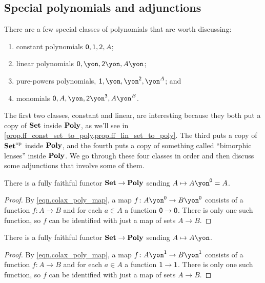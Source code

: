 \documentclass[DynamicalBook]{subfiles}
\begin{document}
\subsection{Special polynomials and adjunctions}

There are a few special classes of polynomials that are worth discussing: 
\begin{enumerate}
	\item constant polynomials $\textsf{0},\textsf{1},\textsf{2},A$; 
	\item linear polynomials $\0,\yon, \2\yon, A\yon$;
	\item pure-powers polynomials, $\1, \yon, \yon^\2, \yon^A$; and 
	\item monomials $\0, A, \yon, \2\yon^\3, A\yon^B$.
\end{enumerate}
The first two classes, constant and linear, are interesting because they both put a copy of $\textbf{Set}$ inside $\textbf{Poly}$, as we'll see in \cref{prop.ff_const_set_to_poly,prop.ff_lin_set_to_poly}. The third puts a copy of $\textbf{Set}^{\textnormal{op}}$ inside $\textbf{Poly}$, and the fourth puts a copy of something called ``bimorphic lenses'' inside $\textbf{Poly}$. We go through these four classes in order and then discuss some adjunctions that involve some of them.

\begin{proposition}\label{prop.ff_const_set_to_poly}
There is a fully faithful functor $\textbf{Set}\to\textbf{Poly}$ sending $A\mapsto A\yon^\0=A$.
\end{proposition}
\begin{proof}
By \cref{eqn.colax_poly_map}, a map $f\colon A\yon^\0\to B\yon^\0$ consists of a function $f\colon A\to B$ and for each $a\in A$ a function $\textsf{0}\to\textsf{0}$. There is only one such function, so $f$ can be identified with just a map of sets $A\to B$.
\end{proof}

\begin{proposition}\label{prop.ff_lin_set_to_poly}
There is a fully faithful functor $\textbf{Set}\to\textbf{Poly}$ sending $A\mapsto A\yon$.
\end{proposition}
\begin{proof}
By \cref{eqn.colax_poly_map}, a map $f\colon A\yon^\1\to B\yon^\1$ consists of a function $f\colon A\to B$ and for each $a\in A$ a function $\textsf{1}\to\textsf{1}$. There is only one such function, so $f$ can be identified with just a map of sets $A\to B$.
\end{proof}
\end{document}
